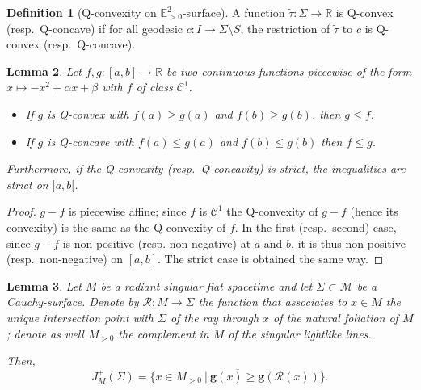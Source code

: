 \documentclass[a4paper,12pt]{article}
\def\M{\mathcal{M}}
\def\R{\mathbb{R}}
\def\E{\mathbf E}
\def\E{\mathbb{E}}
\def\RR{\mathbb{R}}
\def\R{\mathcal R}
\def\quadform{\mathbf{g}}
\def\E{\mathbb{E}}
\def\M{\mathcal M}
\newtheorem{lem}{Lemma}[section]		 %
\theoremstyle{definition}
\newtheorem{defi}[lem]{Definition}	%
\begin{document}
					\begin{defi}[Q-convexity on $\E^2_{>0}$-surface]

						A function $\widetilde\tau: \Sigma \rightarrow \RR$ is Q-convex (resp.\ Q-concave) if for all geodesic 
						$c: I \rightarrow \Sigma\setminus S$, the restriction of $\widetilde\tau$ to $c$ is Q-convex (resp.\ Q-concave).
					\end{defi}


					

					\begin{lem}\label{lem:diff_Q_convexe} Let $f,g:[a,b]\rightarrow \RR$ be two continuous functions piecewise of the form $x\mapsto-x^2+\alpha x+\beta$ with $f$ of class $\mathscr C^1$.
					\begin{itemize}
					 \item If $g$ is Q-convex with $f(a)\geq g(a)$ and $f(b)\geq g(b)$. then $g\leq f$.
					 \item If $g$ is Q-concave with $f(a)\leq g(a)$ and $f(b)\leq g(b)$ then $f\leq g$.
					\end{itemize}
					Furthermore, if the Q-convexity (resp.\ Q-concavity) is strict, the inequalities are strict on $]a,b[$.

					
					
					\end{lem}
					\begin{proof} $g-f$ is piecewise affine; since $f$ is $\mathscr C^1$ the Q-convexity of $g-f$ (hence its convexity) is the same as the Q-convexity of $f$. In the first (resp.\ second) case, since $g-f$ is non-positive (resp. non-negative)  at $a$ and $b$, it is thus non-positive (resp.\ non-negative) on $[a,b]$. The strict case is obtained the same way.
					\end{proof}
\begin{lem}\label{lem:future_radiant} Let $M$ be a radiant singular flat spacetime and let $\Sigma\subset \M$ be a Cauchy-surface. Denote by $\R:M\rightarrow \Sigma$ the function that associates to $x\in M$ the unique intersection point with $\Sigma$ of the ray through $x$ of the natural foliation of $M$; denote as well $M_{>0}$ the complement in $M$ of the singular lightlike lines.
		
		Then, 
		$$J^+_M(\Sigma) = \overline{\{x\in M_{>0}~|~ \quadform(x)\geq \quadform(\R(x))\}}.$$ 
		\end{lem}
\end{document}
